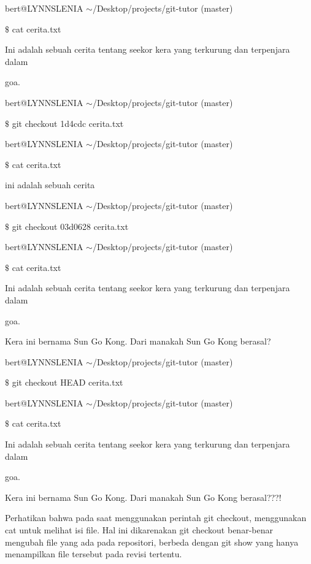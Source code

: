 \vspace{12pt}
bert@LYNNSLENIA  $  \sim  $/Desktop/projects/git-tutor (master) \par
 $  \$  $ cat cerita.txt \par
Ini adalah sebuah cerita tentang seekor kera yang terkurung dan terpenjara dalam \par
 goa. \par
bert@LYNNSLENIA  $  \sim  $/Desktop/projects/git-tutor (master) \par
 $  \$  $ git checkout 1d4cdc cerita.txt \par
\vspace{12pt}
bert@LYNNSLENIA  $  \sim  $/Desktop/projects/git-tutor (master) \par
 $  \$  $ cat cerita.txt \par
ini adalah sebuah cerita \par
\vspace{12pt}
bert@LYNNSLENIA  $  \sim  $/Desktop/projects/git-tutor (master) \par
 $  \$  $ git checkout 03d0628 cerita.txt \par
\vspace{12pt}
bert@LYNNSLENIA  $  \sim  $/Desktop/projects/git-tutor (master) \par
 $  \$  $ cat cerita.txt \par
Ini adalah sebuah cerita tentang seekor kera yang terkurung dan terpenjara dalam \par
 goa. \par
\vspace{12pt}
Kera ini bernama Sun Go Kong. Dari manakah Sun Go Kong berasal? \par
bert@LYNNSLENIA  $  \sim  $/Desktop/projects/git-tutor (master) \par
 $  \$  $ git checkout HEAD cerita.txt \par
\vspace{12pt}
bert@LYNNSLENIA  $  \sim  $/Desktop/projects/git-tutor (master) \par
 $  \$  $ cat cerita.txt \par
Ini adalah sebuah cerita tentang seekor kera yang terkurung dan terpenjara dalam \par
 goa. \par
\vspace{12pt}
Kera ini bernama Sun Go Kong. Dari manakah Sun Go Kong berasal???! \par
\vspace{11pt}
\noindent 
{\fontsize{11pt}{11pt}\selectfont  \hspace*{0.5in} Perhatikan bahwa pada saat menggunakan perintah git checkout, menggunakan cat untuk melihat isi file. Hal ini dikarenakan git checkout benar-benar mengubah file yang ada pada repositori, berbeda dengan git show yang hanya menampilkan file tersebut pada revisi tertentu.} \par
\vspace{12pt}

